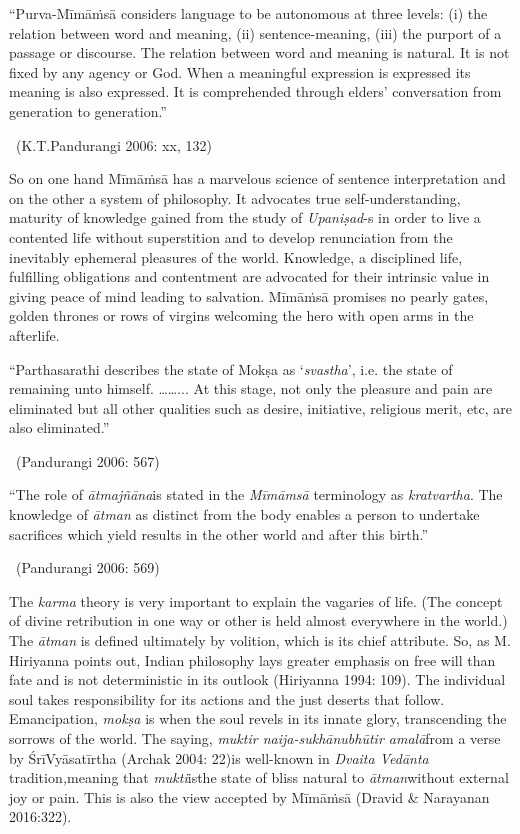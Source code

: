 \begin{myquote}
“Purva-Mīmāṁsā considers language to be autonomous at three levels: (i) the relation between word and meaning, (ii) sentence-meaning, (iii) the purport of a passage or discourse. The relation between word and meaning is natural. It is not fixed by any agency or God. When a meaningful expression is expressed its meaning is also expressed. It is comprehended through elders’ conversation from generation to generation.” 

~\hfill (K.T.Pandurangi 2006: xx, 132)
\end{myquote}

So on one hand Mīmāṁsā has a marvelous science of sentence interpretation and on the other a system of philosophy. It advocates true self-understanding, maturity of knowledge gained from the study of \textit{Upaniṣad}-s in order to live a contented life without superstition and to develop renunciation from the inevitably ephemeral pleasures of the world. Knowledge, a disciplined life, fulfilling obligations and contentment are advocated for their intrinsic value in giving peace of mind leading to salvation. Mīmāṁsā promises no pearly gates, golden thrones or rows of virgins welcoming the hero with open arms in the afterlife.

\begin{myquote}
“Parthasarathi describes the state of Mokṣa as ‘\textit{svastha}’, i.e. the state of remaining unto himself. ……... At this stage, not only the pleasure and pain are eliminated but all other qualities such as desire, initiative, religious merit, etc, are also eliminated.” 

~\hfill (Pandurangi 2006: 567)
\end{myquote}

\begin{myquote}
“The role of \textit{ātmajñāna}is stated in the\textit{ Mīmāmsā} terminology as \textit{kratvartha}. The knowledge of \textit{ātman} as distinct from the body enables a person to undertake sacrifices which yield results in the other world and after this birth.” 

~\hfill (Pandurangi 2006: 569)
\end{myquote}

The \textit{karma} theory is very important to explain the vagaries of life. (The concept of divine retribution in one way or other is held almost everywhere in the world.) The \textit{ātman} is defined ultimately by volition, which is its chief attribute. So, as M. Hiriyanna points out, Indian philosophy lays greater emphasis on free will than fate and is not deterministic in its outlook (Hiriyanna 1994: 109). The individual soul takes responsibility for its actions and the just deserts that follow. Emancipation, \textit{mokṣa} is when the soul revels in its innate glory, transcending the sorrows of the world. The saying, \textit{muktir naija-sukhānubhūtir amalā}from a verse by ŚrīVyāsatīrtha (Archak 2004: 22)is well-known in \textit{Dvaita Vedānta} tradition\textit{,}meaning that\textit{ mukti}isthe state of bliss natural to\textit{ ātman}without external joy or pain. This is also the view accepted by Mīmāṁsā (Dravid \& Narayanan 2016:322).

